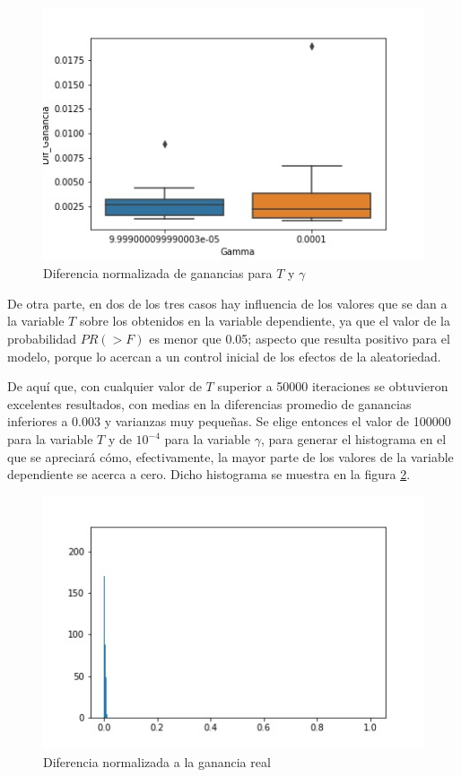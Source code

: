 \begin{figure}[H]
	\centering
	\includegraphics[scale=0.5]{cajasGamma_exp4.jpg}
	\caption{Diferencia normalizada de ganancias para $T$ y $\gamma$}
	\label{CajasGamma}
\end{figure}

De otra parte, en dos de los tres casos hay influencia de los valores que se dan a la variable $T$ sobre los obtenidos en la variable dependiente, ya que el valor de la probabilidad $PR(>F)$ es menor que 0.05; aspecto que resulta positivo para el modelo, porque lo acercan a un control inicial de los efectos de la aleatoriedad.

De aquí que, con cualquier valor de $T$ superior a 50000 iteraciones se obtuvieron excelentes resultados, con medias en la diferencias promedio de ganancias inferiores a 0.003 y varianzas muy pequeñas. Se elige entonces el valor de 100000 para la variable $T$ y de $10^{-4}$ para la variable $\gamma$, para generar el histograma en el que se apreciará cómo, efectivamente, la mayor parte de los valores de la variable dependiente se acerca a cero. Dicho histograma se muestra en la figura \ref{histo4}.

\begin{figure}[h]
	\centering
	\includegraphics[scale=0.5]{Histograma_gamma3.jpg}
	\caption{Diferencia normalizada a la ganancia real}
	\label{histo4}
\end{figure}

